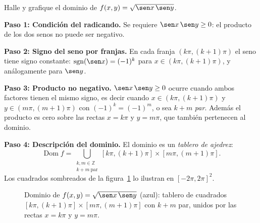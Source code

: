 \begin{prob}
Halle y grafique el dominio de $f(x,y)=\sqrt{\sen x\,\sen y}$.
\begin{myproof}
\textbf{Paso 1: Condición del radicando.}
Se requiere $\sen x\,\sen y\ge 0$: el producto de los dos senos no puede
ser negativo.

\textbf{Paso 2: Signo del seno por franjas.}
En cada franja $(k\pi,(k+1)\pi)$ el seno tiene signo constante:
$\operatorname{sgn}(\sen x)=(-1)^k$ para $x\in(k\pi,(k+1)\pi)$, y análogamente
para $\sen y$.

\textbf{Paso 3: Producto no negativo.}
$\sen x\,\sen y\ge 0$ ocurre cuando ambos factores tienen el mismo signo, es
decir cuando $x\in(k\pi,(k+1)\pi)$ y $y\in(m\pi,(m+1)\pi)$ con
$(-1)^k=(-1)^m$, o sea $k+m$ \emph{par}. Además el producto es cero sobre las
rectas $x=k\pi$ y $y=m\pi$, que también pertenecen al dominio.

\textbf{Paso 4: Descripción del dominio.}
El dominio es un \emph{tablero de ajedrez}:
\[
  \boxed{\ \operatorname{Dom}f=\bigcup_{\substack{k,m\in\mathbb{Z}\\ k+m\ \text{par}}}
  [k\pi,(k+1)\pi]\times[m\pi,(m+1)\pi].\ }
\]
Los cuadrados sombreados de la figura~\ref{fig:dominio_tablero} lo ilustran en
$[-2\pi,2\pi]^2$.
\end{myproof}
\end{prob}

\begin{figure}[!htbp]
\centering
{}
\caption{Dominio de $f(x,y)=\sqrt{\sen x\,\sen y}$ (azul): tablero de cuadrados
  $[k\pi,(k+1)\pi]\times[m\pi,(m+1)\pi]$ con $k+m$ par, unidos por las rectas
  $x=k\pi$ y $y=m\pi$.}
\label{fig:dominio_tablero}
\end{figure}

